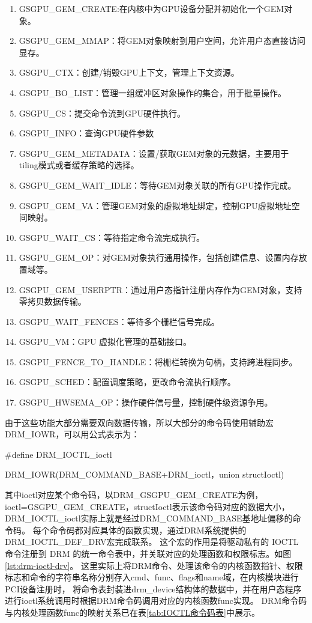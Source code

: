 \begin{enumerate}[1)]
  \item GSGPU\_GEM\_CREATE:在内核中为GPU设备分配并初始化一个GEM对象。
  \item GSGPU\_GEM\_MMAP：将GEM对象映射到用户空间，允许用户态直接访问显存。
  \item GSGPU\_CTX：创建/销毁GPU上下文，管理上下文资源。
  \item GSGPU\_BO\_LIST：管理一组缓冲区对象操作的集合，用于批量操作。
  \item GSGPU\_CS：提交命令流到GPU硬件执行。
  \item GSGPU\_INFO：查询GPU硬件参数
  \item GSGPU\_GEM\_METADATA：设置/获取GEM对象的元数据，主要用于tiling模式或者缓存策略的选择。
  \item GSGPU\_GEM\_WAIT\_IDLE：等待GEM对象关联的所有GPU操作完成。
  \item GSGPU\_GEM\_VA：管理GEM对象的虚拟地址绑定，控制GPU虚拟地址空间映射。
  \item GSGPU\_WAIT\_CS：等待指定命令流完成执行。
  \item GSGPU\_GEM\_OP：对GEM对象执行通用操作，包括创建信息、设置内存放置域等。
  \item GSGPU\_GEM\_USERPTR：通过用户态指针注册内存作为GEM对象，支持零拷贝数据传输。
  \item GSGPU\_WAIT\_FENCES：等待多个栅栏信号完成。
  \item GSGPU\_VM：GPU 虚拟化管理的基础接口。
  \item GSGPU\_FENCE\_TO\_HANDLE：将栅栏转换为句柄，支持跨进程同步。
  \item GSGPU\_SCHED：配置调度策略，更改命令流执行顺序。
  \item GSGPU\_HWSEMA\_OP：操作硬件信号量，控制硬件级资源争用。
\end{enumerate}
由于这些功能大部分需要双向数据传输，所以大部分的命令码使用辅助宏DRM\_IOWR，可以用公式表示为：

\#define DRM\_IOCTL\_ioctl

 DRM\_IOWR(DRM\_COMMAND\_BASE+DRM\_ioctl，union structIoctl)

其中ioctl对应某个命令码，以DRM\_GSGPU\_GEM\_CREATE为例，ioctl=GSGPU\_GEM\_CREATE，structIoctl表示该命令码对应的数据大小，
DRM\_IOCTL\_ioctl实际上就是经过DRM\_COMMAND\_BASE基地址偏移的命令码。
每个命令码都对应具体的函数实现，通过DRM系统提供的DRM\_IOCTL\_DEF\_DRV宏完成联系。
这个宏的作用是将驱动私有的 IOCTL 命令注册到 DRM 的统一命令表中，并关联对应的处理函数和权限标志。如图\ref{lst:drm-ioctl-drv}。
这里实际上将DRM命令、处理该命令的内核函数指针、权限标志和命令的字符串名称分别存入cmd、func、flags和name域，在内核模块进行PCI设备注册时，
将命令表封装进drm\_device结构体的数据中，并在用户态程序进行ioctl系统调用时根据DRM命令码调用对应的内核函数func实现。
DRM命令码与内核处理函数func的映射关系已在表\ref{tab:IOCTL命令码表}中展示。

